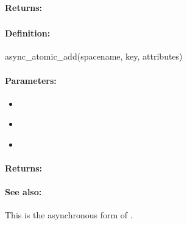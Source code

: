 \paragraph{Returns:}


\pagebreak
\subsubsection{}
\label{api:ruby:async_atomic_add}


\paragraph{Definition:}
\begin{rubycode}
async_atomic_add(spacename, key, attributes)
\end{rubycode}

\paragraph{Parameters:}
\begin{itemize}[noitemsep]
\item {}\\

\item {}\\

\item {}\\

\end{itemize}

\paragraph{Returns:}


\paragraph{See also:}  This is the asynchronous form of .

\pagebreak
\subsubsection{}
\label{api:ruby:cond_atomic_add}


